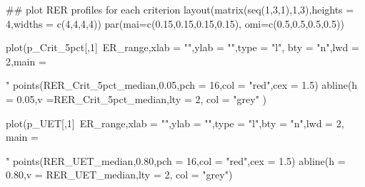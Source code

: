 \documentclass[
  11pt,
]{article}
\newenvironment{Shaded}{}{}
\newcommand{\CommentTok}[1]{\textcolor[rgb]{0.00,0.50,0.00}{#1}}
\newcommand{\DataTypeTok}[1]{#1}
\newcommand{\DecValTok}[1]{#1}
\newcommand{\FloatTok}[1]{#1}
\newcommand{\KeywordTok}[1]{\textcolor[rgb]{0.00,0.00,1.00}{#1}}
\newcommand{\NormalTok}[1]{#1}
\newcommand{\OperatorTok}[1]{#1}
\newcommand{\StringTok}[1]{\textcolor[rgb]{0.00,0.50,0.50}{#1}}
\begin{document}
\begin{Shaded}
\begin{Highlighting}[]
\CommentTok{## plot RER profiles for each criterion}
\KeywordTok{layout}\NormalTok{(}\KeywordTok{matrix}\NormalTok{(}\KeywordTok{seq}\NormalTok{(}\DecValTok{1}\NormalTok{,}\DecValTok{3}\NormalTok{,}\DecValTok{1}\NormalTok{),}\DecValTok{1}\NormalTok{,}\DecValTok{3}\NormalTok{),}\DataTypeTok{heights =} \DecValTok{4}\NormalTok{,}\DataTypeTok{widths =} \KeywordTok{c}\NormalTok{(}\DecValTok{4}\NormalTok{,}\DecValTok{4}\NormalTok{,}\DecValTok{4}\NormalTok{,}\DecValTok{4}\NormalTok{)) }
\KeywordTok{par}\NormalTok{(}\DataTypeTok{mai=}\KeywordTok{c}\NormalTok{(}\FloatTok{0.15}\NormalTok{,}\FloatTok{0.15}\NormalTok{,}\FloatTok{0.15}\NormalTok{,}\FloatTok{0.15}\NormalTok{), }\DataTypeTok{omi=}\KeywordTok{c}\NormalTok{(}\FloatTok{0.5}\NormalTok{,}\FloatTok{0.5}\NormalTok{,}\FloatTok{0.5}\NormalTok{,}\FloatTok{0.5}\NormalTok{))}

\KeywordTok{plot}\NormalTok{(p_Crit_5pct[,}\DecValTok{1}\NormalTok{]}\OperatorTok{~}\NormalTok{ER_range,}\DataTypeTok{xlab =} \StringTok{""}\NormalTok{,}\DataTypeTok{ylab =} \StringTok{""}\NormalTok{,}\DataTypeTok{type =} \StringTok{"l"}\NormalTok{, }\DataTypeTok{bty =} \StringTok{"n"}\NormalTok{,}\DataTypeTok{lwd =} \DecValTok{2}\NormalTok{,}\DataTypeTok{main =} \StringTok{"%
\KeywordTok{points}\NormalTok{(RER_Crit_5pct_median,}\FloatTok{0.05}\NormalTok{,}\DataTypeTok{pch =} \DecValTok{16}\NormalTok{,}\DataTypeTok{col =} \StringTok{"red"}\NormalTok{,}\DataTypeTok{cex =} \FloatTok{1.5}\NormalTok{)}
\KeywordTok{abline}\NormalTok{(}\DataTypeTok{h =} \FloatTok{0.05}\NormalTok{,}\DataTypeTok{v =}\NormalTok{RER_Crit_5pct_median,}\DataTypeTok{lty =} \DecValTok{2}\NormalTok{, }\DataTypeTok{col =} \StringTok{"grey"}\NormalTok{ )}

\KeywordTok{plot}\NormalTok{(p_UET[,}\DecValTok{1}\NormalTok{]}\OperatorTok{~}\NormalTok{ER_range,}\DataTypeTok{xlab =} \StringTok{""}\NormalTok{,}\DataTypeTok{ylab =} \StringTok{""}\NormalTok{,}\DataTypeTok{type =} \StringTok{"l"}\NormalTok{,}\DataTypeTok{bty =} \StringTok{"n"}\NormalTok{,}\DataTypeTok{lwd =} \DecValTok{2}\NormalTok{, }\DataTypeTok{main =} \StringTok{"%
\KeywordTok{points}\NormalTok{(RER_UET_median,}\FloatTok{0.80}\NormalTok{,}\DataTypeTok{pch =} \DecValTok{16}\NormalTok{,}\DataTypeTok{col =} \StringTok{"red"}\NormalTok{,}\DataTypeTok{cex =} \FloatTok{1.5}\NormalTok{)}
\KeywordTok{abline}\NormalTok{(}\DataTypeTok{h =} \FloatTok{0.80}\NormalTok{,}\DataTypeTok{v =}\NormalTok{ RER_UET_median,}\DataTypeTok{lty =} \DecValTok{2}\NormalTok{, }\DataTypeTok{col =} \StringTok{"grey"}\NormalTok{)}

}}
\end{Highlighting}
\end{Shaded}
\end{document}
